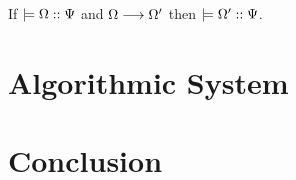 \documentclass[a4paper,USenglish]{lipics-v2016}
\begin{document}
\begin{theorem}[Preservation]
If $\models {\Omega} :: {\Psi}$ and $\Omega \longrightarrow \Omega'$ then $\models {\Omega'} :: {\Psi}$.
\end{theorem}


\section{Algorithmic System}
\label{algorithmic}


\section{Conclusion}
\label{conclusion}


\appendix





\end{document}

